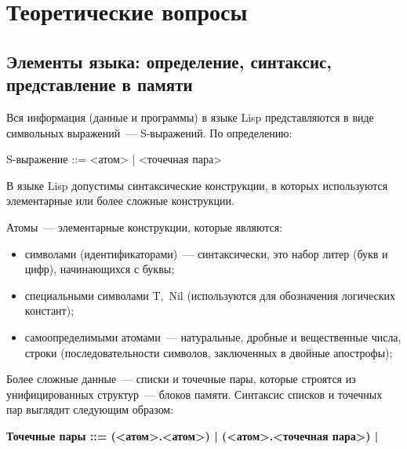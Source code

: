 \chapter{Теоретические вопросы}






\section{Элементы языка: определение, синтаксис, представление в памяти}

Вся информация (данные и программы) в языке Lisp представляются в виде символьных выражений~--- S-выражений. По определению:

\begin{center}
	S-выражение ::= <атом> | <точечная пара>
\end{center}

В языке Lisp допустимы синтаксические конструкции, в которых используются элементарные или более сложные конструкции.

Атомы~--- элементарные конструкции, которые являются:
\begin{itemize}
	\item символами (идентификаторами)~--- синтаксически, это набор литер (букв и цифр), начинающихся с буквы;
	\item специальными символами {T,~Nil} (используются для обозначения логических констант);
	\item самоопределимыми атомами~--- натуральные, дробные и вещественные числа, строки (последовательности символов, заключенных в двойные апострофы);
\end{itemize}

Более сложные данные~--- списки и точечные пары, которые строятся из унифицированных структур~--- блоков памяти.
Синтаксис списков и точечных пар выглядит следующим образом:

\textbf{Точечные пары ::= (<атом>.<атом>) | (<атом>.<точечная пара>) |}

